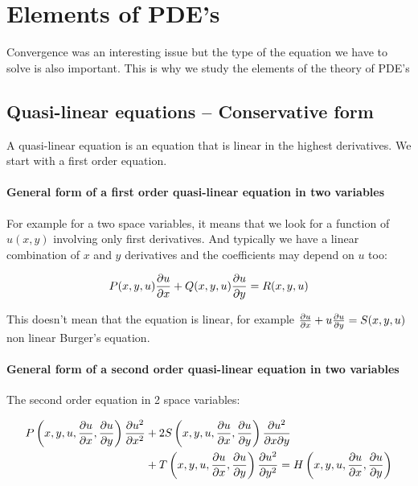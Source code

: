 
\chapter{Elements of PDE's}

Convergence was an interesting issue but the type of the equation we have to solve is also important. This is why we study the elements of the theory of PDE’s

\section{Quasi-linear equations – Conservative form}
A quasi-linear equation is an equation that is linear in the highest derivatives. We start with a first order equation. 

\subsubsection{General form of a first order quasi-linear equation in two variables}
For example for a two space variables, it means that we look for a function of $u(x,y)$ involving only first derivatives. And typically we have a linear combination of $x$ and $y$ derivatives and the coefficients may depend on $u$ too:

\begin{equation}
P(x,y,u) \frac{\partial u}{\partial x} + Q(x,y,u) \frac{\partial u}{\partial y} = R(x,y,u)
\end{equation}

This doesn't mean that the equation is linear, for example $\frac{\partial u}{\partial x} + u \frac{\partial u}{\partial y} = S(x,y,u)$ non linear Burger's equation. 

\subsubsection{General form of a second order quasi-linear equation in two variables}

The second order equation in 2 space variables: 

\begin{equation}
\begin{aligned}
P\left(x,y,u, \frac{\partial u}{\partial x}, \frac{\partial u}{\partial y}\right) \frac{\partial u^2}{\partial x^2} &+ 2 S\left(x,y,u, \frac{\partial u}{\partial x}, \frac{\partial u}{\partial y}\right) \frac{\partial u^2}{\partial x \partial y}\\
&+ T\left(x,y,u, \frac{\partial u}{\partial x}, \frac{\partial u}{\partial y}\right) \frac{\partial u^2}{\partial y^2} = H\left(x,y,u, \frac{\partial u}{\partial x}, \frac{\partial u}{\partial y}\right)
\end{aligned}
\end{equation}


